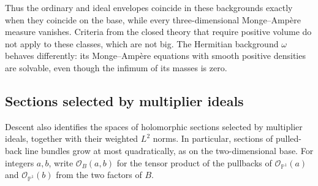 Thus the ordinary and ideal envelopes coincide in these backgrounds exactly when they coincide on the base, while every three-dimensional Monge--Amp\`ere measure vanishes. Criteria from the closed theory that require positive volume do not apply to these classes, which are not big. The Hermitian background $\omega$ behaves differently: its Monge--Amp\`ere equations with smooth positive densities are solvable, even though the infimum of its masses is zero.

\subsection{Sections selected by multiplier ideals}

Descent also identifies the spaces of holomorphic sections selected by multiplier ideals, together with their weighted $L^2$ norms. In particular, sections of pulled-back line bundles grow at most quadratically, as on the two-dimensional base. For integers $a,b$, write $\mathcal O_B(a,b)$ for the tensor product of the pullbacks of $\mathcal O_{\mathbb P^1}(a)$ and $\mathcal O_{\mathbb P^1}(b)$ from the two factors of $B$.


